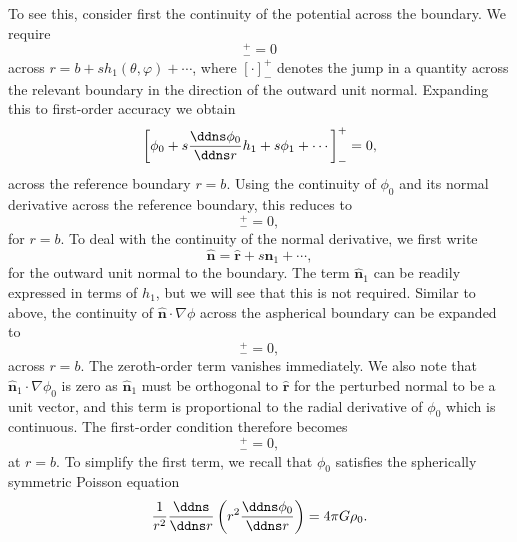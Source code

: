 To see this, consider first the continuity of the potential across the boundary. We require
\begin{equation*}
    [\phi]_{-}^{+}=0
\end{equation*}
across $r=b+sh_{1}(\theta,\varphi)+\cdots$, where $[\cdot]_{-}^{+}$ denotes the jump in a quantity across the relevant boundary in the direction of the outward unit normal. Expanding this to first-order accuracy we obtain
\begin{equation*}
    \left[\phi_{0}+s\frac{\ddns\phi_{0}}{\ddns r}h_{1}+s\phi_{1}+\cdots\right]_{-}^{+}=0,
\end{equation*}
across the reference boundary $r=b$. Using the continuity of $\phi_{0}$ and its normal derivative across the reference boundary, this reduces to
\begin{equation*}
    [\phi_{1}]_{-}^{+}=0,
\end{equation*}
for $r=b$. To deal with the continuity of the normal derivative, we first write
\begin{equation*}
    \hat{\mathbf{n}}=\hat{\mathbf{r}}+s\hat{\mathbf{n}}_{1}+\cdots,
\end{equation*}
for the outward unit normal to the boundary. The term $\hat{\mathbf{n}}_{1}$ can be readily expressed in terms of $h_{1}$, but we will see that this is not required. Similar to above, the continuity of $\hat{\mathbf{n}}\cdot\nabla\phi$ across the aspherical boundary can be expanded to
\begin{equation*}
    [\hat{\mathbf{r}}\cdot\nabla\phi_{0}+s(\hat{\mathbf{r}}\cdot\nabla)(\hat{\mathbf{r}}\cdot\nabla\phi_{0})h_{1}+s\hat{\mathbf{n}}_{1}\cdot\nabla\phi_{0}+s\hat{\mathbf{r}}\cdot\nabla\phi_{1}+\cdots]_{-}^{+}=0,
\end{equation*}
across $r=b$. The zeroth-order term vanishes immediately. We also note that $\hat{\mathbf{n}}_{1}\cdot\nabla\phi_{0}$ is zero as $\hat{\mathbf{n}}_{1}$ must be orthogonal to $\hat{\mathbf{r}}$ for the perturbed normal to be a unit vector, and this term is proportional to the radial derivative of $\phi_{0}$ which is continuous. The first-order condition therefore becomes
\begin{equation*}
    [(\hat{\mathbf{r}}\cdot\nabla)(\hat{\mathbf{r}}\cdot\nabla\phi_{0})h_{1}+\hat{\mathbf{r}}\cdot\nabla\phi_{1}]_{-}^{+}=0,
\end{equation*}
at $r=b$. To simplify the first term, we recall that $\phi_{0}$ satisfies the spherically symmetric Poisson equation
\begin{equation*}
    \frac{1}{r^{2}}\frac{\ddns}{\ddns r}\left(r^{2}\frac{\ddns\phi_{0}}{\ddns r}\right)=4\pi G\rho_{0}.
\end{equation*}
